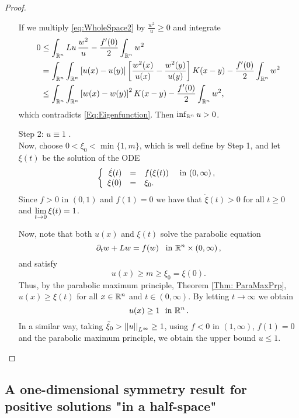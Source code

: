 \begin{proof}
\begin{enumerate}
If we multiply \eqref{eq:WholeSpace2} by $\frac{w^2}{u}\geq 0$ and integrate
\begin{align*}
0 &\leq \int_{\mathbb{R}^n} Lu\,\frac{w^2}{u} - \frac{f'(0)}{2}\int_{\mathbb{R}^n} w^2 \\
&= \int_{\mathbb{R}^n}\int_{\mathbb{R}^n}\left[ u(x)-u(y) \right]\left[ \frac{w^2(x)}{u(x)}-\frac{w^2(y)}{u(y)} \right] K(x-y) - \frac{f'(0)}{2}\int_{\mathbb{R}^n} w^2 \\
&\leq \int_{\mathbb{R}^n}\int_{\mathbb{R}^n} \left[ w(x)-w(y)\right]^2 K(x-y) - \frac{f'(0)}{2}\int_{\mathbb{R}^n} w^2,
\end{align*}
which contradicts \eqref{Eq:Eigenfunction}. Then $\inf_{\mathbb{R}^n} u >0$.\\

\item[Step 2:] $u\equiv 1$ .\\
Now, choose $0<\xi_0<\min\{1,m\}$, which is well define by Step 1, and let $\xi(t)$ be the solution of the ODE
$$
\left\{\begin{array}{rcll}
\dot{\xi}(t) &=& f(\xi(t)) & \textrm{ in }(0,\infty)\,,\\
\xi(0) &=& \xi_0.
\end{array} \right.
$$
Since $f>0$ in $(0,1)$ and $f(1) = 0$ we have that $\dot{\xi}(t)>0$ for all $t\geq 0$ and $\displaystyle \lim_{t\to 0} \xi(t) = 1$.

Now, note that both $u(x)$ and $\xi(t)$ solve the parabolic equation
$$ \partial_t w + Lw = f(w) \,\,\, \textrm{ in }\mathbb{R}^n\times (0,\infty)\,, $$
and satisfy
$$ u(x) \geq m \geq \xi_0 = \xi(0). $$
Thus, by the parabolic maximum principle, Theorem \ref{Thm: ParaMaxPrp}, $u(x)\geq \xi(t)$ for all $x\in\mathbb{R}^n$ and $t\in(0,\infty)$. By letting $t \to \infty$ we obtain
$$ u(x) \geq 1 \,\, \textrm{ in }\mathbb{R}^n\,.  $$
In a similar way, taking $\tilde{\xi}_0>\left | \left |{u} \right | \right |_{L^\infty} \geq 1$, using $f<0$ in $(1,\infty)$, $f(1)=0$ and the parabolic maximum principle, we obtain the upper bound $u\leq 1$.
\end{enumerate}
\end{proof}



\subsection{A one-dimensional symmetry result for positive solutions "in a half-space"}


